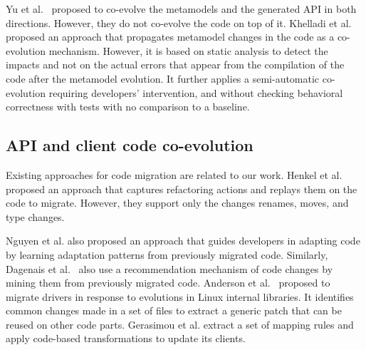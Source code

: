 Yu et al.~\cite{yu2012maintaining} proposed to co-evolve the metamodels and the generated API in both directions. However, they do not co-evolve the code on top of it.%
 Khelladi et al.~\cite{Khelladi2020} proposed an approach that propagates metamodel changes in the code as a co-evolution mechanism. However, it is based on static analysis to detect the impacts and not on the actual errors that appear from the compilation of the code after the metamodel evolution. It further applies a semi-automatic co-evolution requiring developers' intervention, and without checking behavioral correctness with tests with no comparison to a baseline. 
 
 
 \subsection{API and client code co-evolution}
 \label{API_evolution}
 
 
 Existing approaches for code migration are related to our work.%
  Henkel et al.~\cite{henkel2005catchup} proposed an approach that captures refactoring actions and replays them on the code to migrate. However, they support only the changes renames, moves, and type changes. 
 
 Nguyen et al. \cite{nguyen2010graph} also proposed an approach that guides developers in adapting code by learning adaptation patterns from previously migrated code. Similarly, Dagenais et al.~\cite{dagenais2011recommending,5070565,10.1145/1932682.1869486} also use a recommendation mechanism of code changes by mining them from previously migrated code. 
 Anderson et al.~\cite{andersen2010generic} proposed to migrate drivers in response to evolutions in Linux internal libraries. It identifies common changes made in a set of files to extract a generic patch that can be reused on other code parts. Gerasimou et al. \cite{10.1145/3194793.3194798} extract a set of mapping rules and apply code-based transformations to update its clients.
 
% 
 
